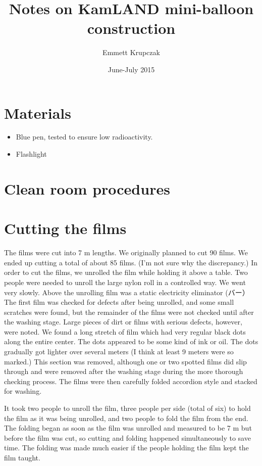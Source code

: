 \documentclass{article}
\title{Notes on KamLAND mini-balloon construction}
\date{June-July 2015}
\author{Emmett Krupczak}
\begin{document}
\maketitle


\section{Materials}
\begin{itemize}
\item Blue pen, tested to ensure low radioactivity. %
\item Flashlight %
\end{itemize}

\section{Clean room procedures}

\section{Cutting the films}
The films were cut into 7 m lengths. We originally planned to cut 90 films. We ended up cutting a total of about 85 films. (I'm not sure why the discrepancy.) 
%
In order to cut the films, we unrolled the film while holding it above a table. Two people were needed to unroll the large nylon roll in a controlled way. We went very slowly. Above the unrolling film was a static electricity eliminator (バー）The first film was checked for defects after being unrolled, and some small scratches were found, but the remainder of the films were not checked until after the washing stage.  Large pieces of dirt or films with serious defects, however, were noted.  We found a long stretch of film which had very regular black dots along the entire center. The dots appeared to be some kind of ink or oil. The dots gradually got lighter over several meters (I think at least 9 meters were so marked.) This section was removed, although one or two spotted films did slip through and were removed after the washing stage during the more thorough checking process. 
The films were then carefully folded accordion style and stacked for washing.

It took two people to unroll the film, three people per side (total of six) to hold the film as it was being unrolled, and two people to fold the film from the end. The folding began as soon as the film was unrolled and measured to be 7 m but before the film was cut, so cutting and folding happened simultaneously to save time. The folding was made much easier if the people holding the film kept the film taught. 
\end{document}

